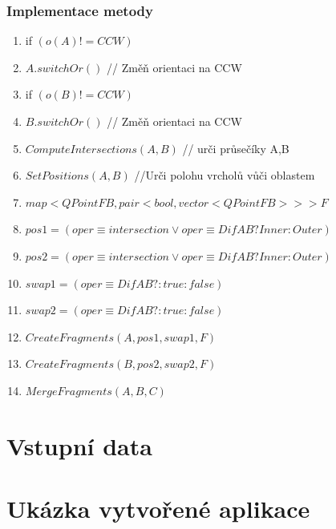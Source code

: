 \documentclass[a4paper, 12pt]{article}
\begin{document}
\subsubsection{Implementace metody}
\begin{enumerate}
	\item if $ (o(A) != CCW) $
	\item \hspace{1cm} $ A.switchOr() $ // Změň orientaci na CCW
	\item if $ (o(B) != CCW) $
	\item \hspace{1cm} $ B.switchOr() $ // Změň orientaci na CCW
	\item $ ComputeIntersections(A,B) $ // urči průsečíky A,B
	\item $ SetPositions (A,B) $ //Urči polohu vrcholů vůči oblastem
	\item $map <QPointFB, pair <bool, vector<QPointFB>>> F$
	\item $ pos1 = (oper \equiv intersection \vee oper \equiv DifAB?Inner:Outer) $
	\item $ pos2 = (oper \equiv intersection \vee oper \equiv DifAB?Inner:Outer) $
	\item $ swap1 = (oper \equiv DifAB? : true : false) $
	\item $ swap2 = (oper \equiv DifAB? : true : false) $
	\item $ CreateFragments (A, pos1, swap1, F) $
	\item $ CreateFragments (B, pos2, swap2, F) $
	\item $ MergeFragments (A,B,C) $
\end{enumerate}

\clearpage

\section{Vstupní data}



\clearpage
\section{Ukázka vytvořené aplikace}

\clearpage

\end{document}
